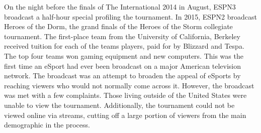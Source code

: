 	On the night before the finals of The International 2014 in August, ESPN3 broadcast a half-hour special profiling the tournament. In 2015, ESPN2 broadcast Heroes of the Dorm, the grand finals of the Heroes of the Storm collegiate tournament. The first-place team from the University of California, Berkeley received tuition for each of the teams players, paid for by Blizzard and Tespa. The top four teams won gaming equipment and new computers. This was the first time an eSport had ever been broadcast on a major American television network. The broadcast was an attempt to broaden the appeal of eSports by reaching viewers who would not normally come across it. However, the broadcast was met with a few complaints. Those living outside of the United States were unable to view the tournament. Additionally, the tournament could not be viewed online via streams, cutting off a large portion of viewers from the main demographic in the process.
	
				
